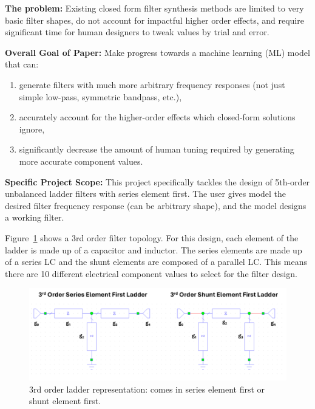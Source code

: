 \documentclass[10pt,conference]{IEEEtran}
\begin{document}
\vspace{1em}

\textbf{The problem:}
Existing closed form filter synthesis methods are limited to very basic filter shapes, do not account for impactful higher order effects, and require significant time for human designers to tweak values by trial and error.

\vspace{1em}

\textbf{Overall Goal of Paper:}
Make progress towards a machine learning (ML) model that can:
\begin{enumerate}[label=\arabic*)]
    \item generate filters with much more arbitrary frequency responses (not just simple low-pass, symmetric bandpass, etc.),
    \item accurately account for the higher-order effects which closed-form solutions ignore,
    \item significantly decrease the amount of human tuning required by generating more accurate component values.
\end{enumerate}

\vspace{1em}

\textbf{Specific Project Scope:}
This project specifically tackles the design of 5th-order unbalanced ladder filters with series element first. The user gives model the desired filter frequency response (can be arbitrary shape), and the model designs a working filter.

Figure~\ref{Ladder_Topology_3rd_order} shows a 3rd order filter topology. For this design, each element of the ladder is made up of a capacitor and inductor. The series elements are made up of a series LC and the shunt elements are composed of a parallel LC. This means there are 10 different electrical component values to select for the filter design.


\begin{figure}
	\centering
	\includegraphics[width=0.9\linewidth]{Figures/Ladder_Topology_3rd_order.png}
	\caption{3rd order ladder representation: comes in series element first or shunt element first.}
	\label{Ladder_Topology_3rd_order}
\end{figure}
\end{document}
